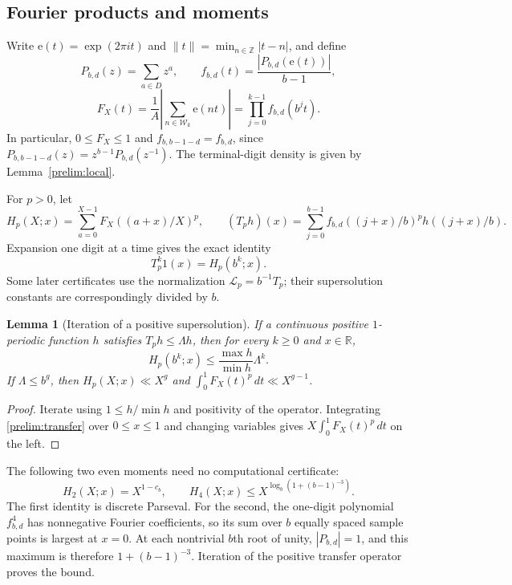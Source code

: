 \documentclass[11pt,a4paper]{article}
\theoremstyle{paperplain}
\newtheorem{lemma}[theorem]{Lemma}
\numberwithin{equation}{section}
\begin{document}
\subsection{Fourier products and moments}

Write $\mathrm e(t)=\exp(2\pi i t)$ and
$\|t\|=\min_{n\in\mathbb Z}|t-n|$, and define
\[
 P_{b,d}(z)=\sum_{a\in D}z^a,\qquad
 f_{b,d}(t)=\frac{|P_{b,d}(\mathrm e(t))|}{b-1},
\]
\[
 F_X(t)=\frac1A\left|\sum_{n\in\mathcal W_k}\mathrm e(nt)\right|
       =\prod_{j=0}^{k-1}f_{b,d}(b^jt).
\]
In particular, $0\leqslant F_X\leqslant1$ and
$f_{b,b-1-d}=f_{b,d}$, since
$P_{b,b-1-d}(z)=z^{b-1}P_{b,d}(z^{-1})$. The terminal-digit density is
given by Lemma~\ref{prelim:local}.

For $p>0$, let
\[
 H_p(X;x)=\sum_{a=0}^{X-1}F_X((a+x)/X)^p,
 \qquad
 (T_ph)(x)=\sum_{j=0}^{b-1}f_{b,d}((j+x)/b)^p h((j+x)/b).
\]
Expansion one digit at a time gives the exact identity
\begin{equation}\label{prelim:transfer}
 T_p^k1(x)=H_p(b^k;x).
\end{equation}
Some later certificates use the normalization $\mathcal L_p=b^{-1}T_p$;
their supersolution constants are correspondingly divided by $b$.

\begin{lemma}[Iteration of a positive supersolution]\label{prelim:supersolution}
If a continuous positive $1$-periodic function $h$ satisfies
$T_ph\leqslant\Lambda h$, then for every $k\geqslant0$ and $x\in\mathbb R$,
\[
 H_p(b^k;x)\leqslant\frac{\max h}{\min h}\Lambda^k.
\]
If $\Lambda\leqslant b^g$, then $H_p(X;x)\ll X^g$ and
$\int_0^1F_X(t)^p\,dt\ll X^{g-1}$.
\end{lemma}
\begin{proof}
Iterate using $1\leqslant h/\min h$ and positivity of the operator.
Integrating \eqref{prelim:transfer} over $0\leqslant x\leqslant1$ and
changing variables gives $X\int_0^1F_X(t)^p\,dt$ on the left.
\end{proof}

The following two even moments need no computational certificate:
\begin{equation}\label{prelim:even}
 H_2(X;x)=X^{1-c_b},\qquad
 H_4(X;x)\leqslant
 X^{\log_b(1+(b-1)^{-3})}.
\end{equation}
The first identity is discrete Parseval. For the second, the one-digit
polynomial $f_{b,d}^4$ has nonnegative Fourier coefficients, so its sum over
$b$ equally spaced sample points is largest at $x=0$. At each nontrivial
$b$th root of unity, $|P_{b,d}|=1$, and this maximum is therefore
$1+(b-1)^{-3}$. Iteration of the positive transfer operator proves the bound.
\end{document}
